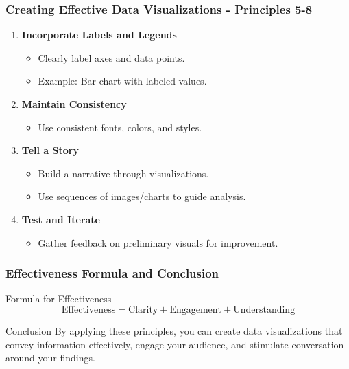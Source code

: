 \documentclass{beamer}
\begin{document}
\begin{frame}[fragile]
    \frametitle{Creating Effective Data Visualizations - Principles 5-8}
    \begin{enumerate}[resume]
        \item \textbf{Incorporate Labels and Legends}
            \begin{itemize}
                \item Clearly label axes and data points.
                \item Example: Bar chart with labeled values.
            \end{itemize}
        \item \textbf{Maintain Consistency}
            \begin{itemize}
                \item Use consistent fonts, colors, and styles.
            \end{itemize}
        \item \textbf{Tell a Story}
            \begin{itemize}
                \item Build a narrative through visualizations.
                \item Use sequences of images/charts to guide analysis.
            \end{itemize}
        \item \textbf{Test and Iterate}
            \begin{itemize}
                \item Gather feedback on preliminary visuals for improvement.
            \end{itemize}
    \end{enumerate}
\end{frame}

\begin{frame}[fragile]
    \frametitle{Effectiveness Formula and Conclusion}
    \begin{block}{Formula for Effectiveness}
        \begin{equation}
        \text{Effectiveness} = \text{Clarity} + \text{Engagement} + \text{Understanding}
        \end{equation}
    \end{block}
    
    \begin{block}{Conclusion}
        By applying these principles, you can create data visualizations that convey information effectively, engage your audience, and stimulate conversation around your findings.
    \end{block}
\end{frame}
\end{document}
